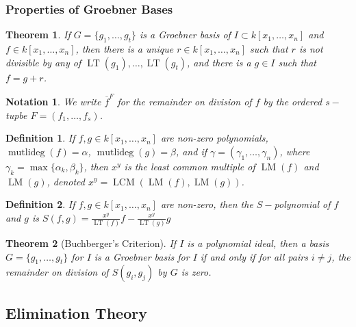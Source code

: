 \documentclass[oneside]{book}
\theoremstyle{mystyle}
\newtheorem{theorem}{Theorem}[section]
\newtheorem{definition}{Definition}[section]
\newtheorem{notation}{Notation}[section]
\DeclareMathOperator{\multideg}{mutlideg}
\DeclareMathOperator{\LT}{LT}
\DeclareMathOperator{\LM}{LM}
\DeclareMathOperator{\LCM}{LCM}
\begin{document}
\subsubsection{Properties of Groebner Bases}
\begin{theorem}
If $G=\{g_1,\hdots, g_t\}$ is a Groebner basis of $I\subset k[x_1,\hdots ,x_n]$ and $f\in k[x_1,\hdots ,x_n]$, then there is a unique $r\in k[x_1,\hdots ,x_n]$ such that $r$ is not divisible by any of $\LT(g_1),\hdots, \LT(g_t)$, and there is a $g\in I$ such that $f = g+r$. 
\end{theorem}
\begin{notation}
We write $\overline{f}^{F}$ for the remainder on division of $f$ by the ordered $s-$tupbe $F = (f_1,\hdots, f_s)$.
\end{notation}
\begin{definition}
If $f,g\in k[x_1,\hdots ,x_n]$ are non-zero polynomials, $\multideg(f) = \alpha$, $\multideg(g) = \beta$, and if $\gamma = (\gamma_1,\hdots, \gamma_n)$, where $\gamma_k = \max\{\alpha_k,\beta_k\}$, then $x^y$ is the least common multiple of $\LM(f)$ and $\LM(g)$, denoted $x^y = \LCM(\LM(f),\LM(g))$.
\end{definition}
\begin{definition}
If $f,g\in k[x_1,\hdots ,x_n]$ are non-zero, then the $S-$polynomial of $f$ and $g$ is $S(f,g) = \frac{x^y}{\LT(f)}f - \frac{x^y}{\LT(g)}g$
\end{definition}
\begin{theorem}[Buchberger's Criterion]
If $I$ is a polynomial ideal, then a basis $G=\{g_1,\hdots, g_t\}$ for $I$ is a Groebner basis for $I$ if and only if for all pairs $i\ne j$, the remainder on division of $S(g_i,g_j)$ by $G$ is zero.
\end{theorem}
\subsection{Elimination Theory}
\end{document}
